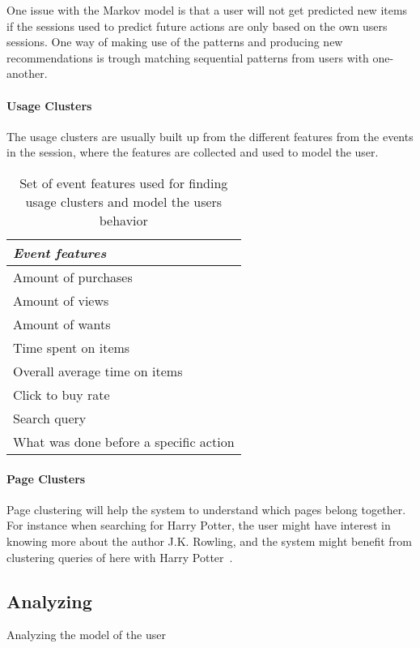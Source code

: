     One issue with the Markov model is that a user will not get predicted new items if the sessions used to predict future actions are only based on the own users sessions.
    One way of making use of the patterns and producing new recommendations is trough matching sequential patterns from users with one-another. 
\paragraph{Usage Clusters} %
    \label{subp:usage_clusters}
    The usage clusters are usually built up from the different features from the events in the session, where the features are collected and used to model the user.

    \begin{table}[H]
        \centering
        \begin{tabular}{l}
        	\toprule
            \emph{Event features} \\ \midrule
            Amount of purchases \\
            Amount of views \\
            Amount of wants  \\
            Time spent on items \\
            Overall average time on items \\
            Click to buy rate \\
            Search query~\cite{Zhang:2006:MSE:1135777.1136004}  \\
            What was done before a specific action  \\
            \bottomrule
        \end{tabular}
        \caption[Event Features]{Set of event features used for finding usage clusters and model the users behavior}
        \label{table:uasageCluster}
    \end{table}
\paragraph{Page Clusters} %
    \label{subp:page_clusters}
    Page clustering will help the system to understand which pages belong together.
    For instance when searching for Harry Potter, the user might have interest in knowing more about the author J.K. Rowling, and the system might benefit from clustering queries of here with Harry Potter~\cite{Zhang:2006:MSE:1135777.1136004}.


\subsection{Analyzing}
    Analyzing the model of the user


